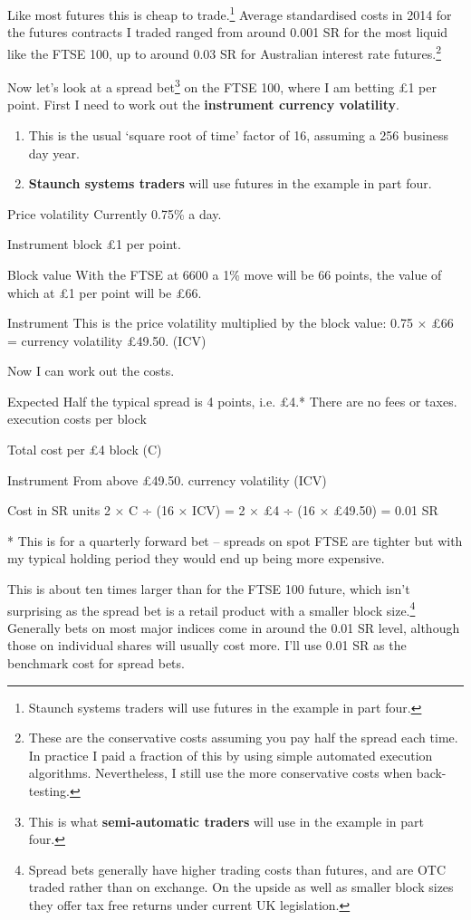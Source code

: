 Like most futures this is cheap to trade.\footnote{Staunch systems traders will use futures in the example in part four.} Average standardised costs in 2014 for the futures contracts I traded ranged from around 0.001 SR for the most liquid like the FTSE 100, up to around 0.03 SR for Australian interest rate futures.\footnote{These are the conservative costs assuming you pay half the spread each time. In practice I paid a fraction of this by using simple automated execution algorithms. Nevertheless, I still use the more conservative costs when back-testing.}

Now let's look at a spread bet\footnote{This is what \textbf{semi-automatic traders} will use in the example in part four.} on the FTSE 100, where I am betting £1 per point. First I need to work out the \textbf{instrument currency volatility}.

\begin{enumerate}
\item This is the usual ‘square root of time' factor of 16, assuming a 256 business day year.
\item \textbf{Staunch systems traders} will use futures in the example in part four. \end{enumerate}

Price volatility Currently 0.75\% a day.

Instrument block £1 per point.

Block value With the FTSE at 6600 a 1\% move will be 66 points, the value of which at £1 per point will be £66.

Instrument This is the price volatility multiplied by the block value: 0.75 × £66 = currency volatility £49.50. (ICV)

Now I can work out the costs.

Expected Half the typical spread is 4 points, i.e. £4.* There are no fees or taxes. execution costs per block

Total cost per £4 block (C)

Instrument From above £49.50. currency volatility (ICV)

Cost in SR units 2 × C ÷ (16 × ICV) = 2 × £4 ÷ (16 × £49.50) = 0.01 SR

* This is for a quarterly forward bet -- spreads on spot FTSE are tighter but with my typical holding period they would end up being more expensive.

This is about ten times larger than for the FTSE 100 future, which isn't surprising as the spread bet is a retail product with a smaller block size.\footnote{Spread bets generally have higher trading costs than futures, and are OTC traded rather than on exchange. On the upside as well as smaller block sizes they offer tax free returns under current UK legislation.} Generally bets on most major indices come in around the 0.01 SR level, although those on individual shares will usually cost more. I'll use 0.01 SR as the benchmark cost for spread bets.

